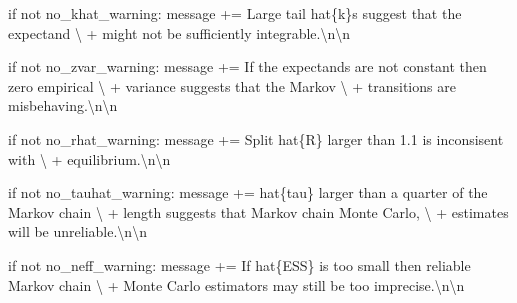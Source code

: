 \documentclass[
  letterpaper,
  DIV=11,
  numbers=noendperiod]{scrartcl}
\newenvironment{Shaded}{\begin{snugshade}}{\end{snugshade}}
\newcommand{\CharTok}[1]{\textcolor[rgb]{0.13,0.47,0.30}{#1}}
\newcommand{\ControlFlowTok}[1]{\textcolor[rgb]{0.00,0.23,0.31}{#1}}
\newcommand{\KeywordTok}[1]{\textcolor[rgb]{0.00,0.23,0.31}{#1}}
\newcommand{\NormalTok}[1]{\textcolor[rgb]{0.00,0.23,0.31}{#1}}
\newcommand{\OperatorTok}[1]{\textcolor[rgb]{0.37,0.37,0.37}{#1}}
\newcommand{\SpecialCharTok}[1]{\textcolor[rgb]{0.37,0.37,0.37}{#1}}
\newcommand{\StringTok}[1]{\textcolor[rgb]{0.13,0.47,0.30}{#1}}
\begin{document}
\begin{Shaded}
\begin{Highlighting}[]
  \ControlFlowTok{if} \KeywordTok{not}\NormalTok{ no\_khat\_warning:}
\NormalTok{    message }\OperatorTok{+=}  \StringTok{\textquotesingle{}Large tail hat}\SpecialCharTok{\{k\}}\StringTok{s suggest that the expectand\textquotesingle{}}\NormalTok{ \textbackslash{}}
              \OperatorTok{+} \StringTok{\textquotesingle{} might not be sufficiently integrable.}\CharTok{\textbackslash{}n\textbackslash{}n}\StringTok{\textquotesingle{}}
  
  \ControlFlowTok{if} \KeywordTok{not}\NormalTok{ no\_zvar\_warning:}
\NormalTok{    message }\OperatorTok{+=}  \StringTok{\textquotesingle{}If the expectands are not constant then zero empirical\textquotesingle{}}\NormalTok{ \textbackslash{}}
              \OperatorTok{+} \StringTok{\textquotesingle{} variance suggests that the Markov\textquotesingle{}}\NormalTok{ \textbackslash{}}
              \OperatorTok{+} \StringTok{\textquotesingle{} transitions are misbehaving.}\CharTok{\textbackslash{}n\textbackslash{}n}\StringTok{\textquotesingle{}}
  
  \ControlFlowTok{if} \KeywordTok{not}\NormalTok{ no\_rhat\_warning:}
\NormalTok{    message }\OperatorTok{+=}  \StringTok{\textquotesingle{}Split hat}\SpecialCharTok{\{R\}}\StringTok{ larger than 1.1 is inconsisent with\textquotesingle{}}\NormalTok{ \textbackslash{}}
              \OperatorTok{+} \StringTok{\textquotesingle{} equilibrium.}\CharTok{\textbackslash{}n\textbackslash{}n}\StringTok{\textquotesingle{}}
  
  \ControlFlowTok{if} \KeywordTok{not}\NormalTok{ no\_tauhat\_warning:}
\NormalTok{    message }\OperatorTok{+=}  \StringTok{\textquotesingle{}hat}\SpecialCharTok{\{tau\}}\StringTok{ larger than a quarter of the Markov chain\textquotesingle{}}\NormalTok{ \textbackslash{}}
              \OperatorTok{+} \StringTok{\textquotesingle{} length suggests that Markov chain Monte Carlo,\textquotesingle{}}\NormalTok{ \textbackslash{}}
              \OperatorTok{+} \StringTok{\textquotesingle{} estimates will be unreliable.}\CharTok{\textbackslash{}n\textbackslash{}n}\StringTok{\textquotesingle{}}
  
  \ControlFlowTok{if} \KeywordTok{not}\NormalTok{ no\_neff\_warning:}
\NormalTok{    message }\OperatorTok{+=}  \StringTok{\textquotesingle{}If hat}\SpecialCharTok{\{ESS\}}\StringTok{ is too small then reliable Markov chain\textquotesingle{}}\NormalTok{ \textbackslash{}}
              \OperatorTok{+} \StringTok{\textquotesingle{} Monte Carlo estimators may still be too imprecise.}\CharTok{\textbackslash{}n\textbackslash{}n}\StringTok{\textquotesingle{}}
  

\end{Highlighting}
\end{Shaded}
\end{document}
